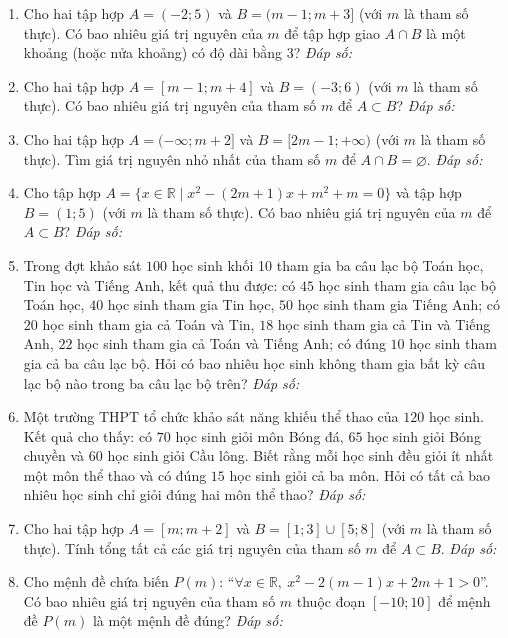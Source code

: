 \documentclass[12pt,a4paper]{article}
\newcommand{\answerbox}{\hfill\textit{Đáp số:}\ \fbox{\rule{0pt}{9pt}\hspace{2.2cm}}}
\begin{document}
\begin{enumerate}
\item Cho hai tập hợp $A = (-2; 5)$ và $B = (m - 1; m + 3]$ (với $m$ là tham số thực). Có bao nhiêu giá trị nguyên của $m$ để tập hợp giao $A \cap B$ là một khoảng (hoặc nửa khoảng) có độ dài bằng $3$?
\answerbox

\item Cho hai tập hợp $A = [m - 1; m + 4]$ và $B = (-3; 6)$ (với $m$ là tham số thực). Có bao nhiêu giá trị nguyên của tham số $m$ để $A \subset B$?
\answerbox

\item Cho hai tập hợp $A = (-\infty; m + 2]$ và $B = [2m - 1; +\infty)$ (với $m$ là tham số thực). Tìm giá trị nguyên nhỏ nhất của tham số $m$ để $A \cap B = \varnothing$.
\answerbox

\item Cho tập hợp $A = \{x \in \mathbb{R} \mid x^2 - (2m + 1)x + m^2 + m = 0\}$ và tập hợp $B = (1; 5)$ (với $m$ là tham số thực). Có bao nhiêu giá trị nguyên của $m$ để $A \subset B$?
\answerbox

\item Trong đợt khảo sát $100$ học sinh khối 10 tham gia ba câu lạc bộ Toán học, Tin học và Tiếng Anh, kết quả thu được: có $45$ học sinh tham gia câu lạc bộ Toán học, $40$ học sinh tham gia Tin học, $50$ học sinh tham gia Tiếng Anh; có $20$ học sinh tham gia cả Toán và Tin, $18$ học sinh tham gia cả Tin và Tiếng Anh, $22$ học sinh tham gia cả Toán và Tiếng Anh; có đúng $10$ học sinh tham gia cả ba câu lạc bộ. Hỏi có bao nhiêu học sinh không tham gia bất kỳ câu lạc bộ nào trong ba câu lạc bộ trên?
\answerbox

\item Một trường THPT tổ chức khảo sát năng khiếu thể thao của $120$ học sinh. Kết quả cho thấy: có $70$ học sinh giỏi môn Bóng đá, $65$ học sinh giỏi Bóng chuyền và $60$ học sinh giỏi Cầu lông. Biết rằng mỗi học sinh đều giỏi ít nhất một môn thể thao và có đúng $15$ học sinh giỏi cả ba môn. Hỏi có tất cả bao nhiêu học sinh chỉ giỏi đúng hai môn thể thao?
\answerbox

\item Cho hai tập hợp $A = [m; m + 2]$ và $B = [1; 3] \cup [5; 8]$ (với $m$ là tham số thực). Tính tổng tất cả các giá trị nguyên của tham số $m$ để $A \subset B$.
\answerbox

\item Cho mệnh đề chứa biến $P(m)$: ``$\forall x \in \mathbb{R},\ x^2 - 2(m - 1)x + 2m + 1 > 0$''. Có bao nhiêu giá trị nguyên của tham số $m$ thuộc đoạn $[-10; 10]$ để mệnh đề $P(m)$ là một mệnh đề đúng?
\answerbox
\end{enumerate}
\end{document}
